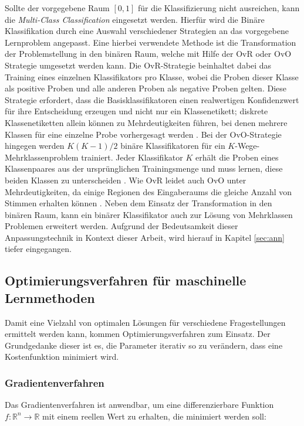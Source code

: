 Sollte der vorgegebene Raum $[0,1]$ für die Klassifizierung nicht ausreichen, kann die \emph{Multi-Class Classification} eingesetzt werden. Hierfür wird die Binäre Klassifikation durch eine Auswahl verschiedener Strategien an das vorgegebene Lernproblem angepasst. Eine hierbei verwendete Methode ist die Transformation der Problemstellung in den binären Raum, welche mit Hilfe der \ac{OvR} oder \ac{OvO} Strategie umgesetzt werden kann. Die \ac{OvR}-Strategie beinhaltet dabei das Training eines einzelnen Klassifikators pro Klasse, wobei die Proben dieser Klasse als positive Proben und alle anderen Proben als negative Proben gelten. Diese Strategie erfordert, dass die Basisklassifikatoren einen realwertigen Konfidenzwert für ihre Entscheidung erzeugen und nicht nur ein Klassenetikett; diskrete Klassenetiketten allein können zu Mehrdeutigkeiten führen, bei denen mehrere Klassen für eine einzelne Probe vorhergesagt werden \cite[182]{Bishop2006}. Bei der \ac{OvO}-Strategie hingegen werden $K(K-1)/2$ binäre Klassifikatoren für ein $K$-Wege-Mehrklassenproblem trainiert. Jeder Klassifikator $K$ erhält die Proben eines Klassenpaares aus der ursprünglichen Trainingsmenge und muss lernen, diese beiden Klassen zu unterscheiden \cite[339]{Bishop2006}. Wie OvR leidet auch OvO unter Mehrdeutigkeiten, da einige Regionen des Eingaberaums die gleiche Anzahl von Stimmen erhalten können \cite[183]{Bishop2006}. 
Neben dem Einsatz der Transformation in den binären Raum, kann ein binärer Klassifikator auch zur Lösung von Mehrklassen Problemen erweitert werden. Aufgrund der Bedeutsamkeit dieser Anpassungstechnik in Kontext dieser Arbeit, wird hierauf in Kapitel \ref{sec:ann} tiefer eingegangen.



\subsection*{Optimierungsverfahren für maschinelle Lernmethoden}\label{sec:optimize}

Damit eine Vielzahl von optimalen Lösungen für verschiedene Fragestellungen ermittelt werden kann, kommen Optimierungsverfahren zum Einsatz. Der Grundgedanke dieser ist es, die Parameter iterativ so zu verändern, dass eine Kostenfunktion minimiert wird.

\subsubsection{Gradientenverfahren}
Das Gradientenverfahren ist anwendbar, um eine differenzierbare Funktion $f:\mathbb{R}^n \rightarrow\mathbb{R}$ mit einem reellen Wert zu erhalten, die minimiert werden soll:


